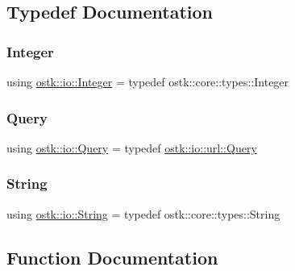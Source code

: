 \subsection{Typedef Documentation}
\mbox{\label{namespaceostk_1_1io_a35328f680550d000b2754860bbe1d268}} 
\subsubsection{\texorpdfstring{Integer}{Integer}}
{\footnotesize\ttfamily using \hyperlink{namespaceostk_1_1io_a35328f680550d000b2754860bbe1d268}{ostk\+::io\+::\+Integer} = typedef ostk\+::core\+::types\+::\+Integer}

\mbox{\label{namespaceostk_1_1io_aeabc644ba5c25896df8014bd0271f970}} 
\subsubsection{\texorpdfstring{Query}{Query}}
{\footnotesize\ttfamily using \hyperlink{namespaceostk_1_1io_aeabc644ba5c25896df8014bd0271f970}{ostk\+::io\+::\+Query} = typedef \hyperlink{classostk_1_1io_1_1url_1_1_query}{ostk\+::io\+::url\+::\+Query}}

\mbox{\label{namespaceostk_1_1io_a95d49b120613a7610cb1b4f03b1116b6}} 
\subsubsection{\texorpdfstring{String}{String}}
{\footnotesize\ttfamily using \hyperlink{namespaceostk_1_1io_a95d49b120613a7610cb1b4f03b1116b6}{ostk\+::io\+::\+String} = typedef ostk\+::core\+::types\+::\+String}



\subsection{Function Documentation}
\mbox{\label{namespaceostk_1_1io_a72e6c8096e4cae52cdd226a664f1b498}} 
